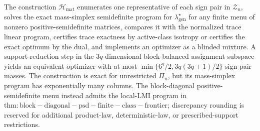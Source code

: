 The construction \(\mathcal H_{\mathrm{mat}}\) enumerates one representative of each sign pair in \(\mathcal Z_n\), solves the exact mass-simplex semidefinite program for \(\lambda_{\mathrm{gen}}^\star\) for any finite menu of nonzero positive-semidefinite matrices, compares it with the normalized trace linear program, certifies trace exactness by active-class isotropy or certifies the exact optimum by the dual, and implements an optimizer as a blinded mixture.  A support-reduction step in the \(3q\)-dimensional block-balanced assignment subspace yields an equivalent optimizer with at most \(\min\{6^q/2,3q(3q+1)/2\}\) sign-pair masses.  The construction is exact for unrestricted \(\Pi_n\), but its mass-simplex program has exponentially many columns.  The block-diagonal positive-semidefinite menu instead admits the local-LMI program in \(\mathrm{thm:block-diagonal-psd-finite-class-frontier}\); discrepancy rounding is reserved for additional product-law, deterministic-law, or prescribed-support restrictions.